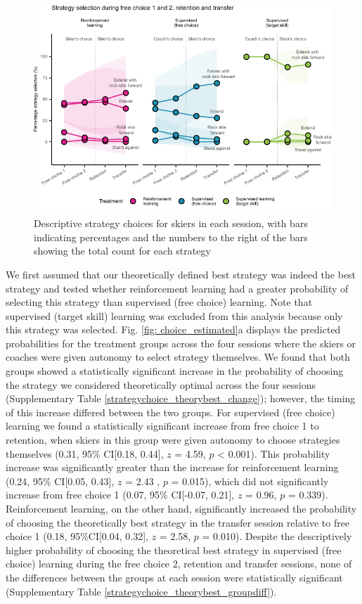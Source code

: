 \documentclass[pdflatex,sn-mathphys-num]{sn-jnl}%
\theoremstyle{thmstyleone}%
\theoremstyle{thmstyletwo}%
\theoremstyle{thmstylethree}%
\begin{document}
\begin{figure}[H]
\centering
\includegraphics{figures/figure_choice_descriptivecount_4.pdf}
\caption{Descriptive strategy choices for skiers in each session, with bars indicating percentages and the numbers to the right of the bars showing the total count for
each strategy}\label{fig: choice_descriptives}
\end{figure}


We first assumed that our theoretically defined best strategy was indeed the best strategy and tested whether reinforcement learning had a greater probability of selecting this strategy than supervised (free choice) learning. Note that supervised (target skill) learning was excluded from this analysis because only this strategy was selected. Fig. \ref{fig: choice_estimated}a displays the predicted probabilities for the treatment groups across the four sessions where the skiers or coaches were given autonomy to select strategy themselves. We found that both groups showed a statistically significant increase in the probability of choosing the strategy we considered theoretically optimal across the four sessions (Supplementary Table \ref{strategychoice_theorybest_change}); however, the timing of this increase differed between the two groups. For supervised (free choice) learning we found a statistically significant increase from free choice 1 to retention, when skiers in this group were given autonomy to choose strategies themselves (0.31, 95\% CI[0.18, 0.44], $z$ = 4.59, $p$ < 0.001). This probability increase was significantly greater than the increase for reinforcement learning (0.24, 95\% CI[0.05, 0.43], $z$ = 2.43 , $p$ = 0.015), which did not significantly increase from free choice 1 (0.07, 95\% CI[-0.07, 0.21], $z$ = 0.96, $p$ = 0.339). Reinforcement learning, on the other hand, significantly increased the probability of choosing the theoretically best strategy in the transfer session relative to free choice 1 (0.18, 95\%CI[0.04, 0.32], $z$ = 2.58, $p$ = 0.010). Despite the descriptively higher probability of choosing the theoretical best strategy in supervised (free choice) learning during the free choice 2, retention and transfer sessions, none of the differences between the groups at each session were statistically significant (Supplementary Table \ref{strategychoice_theorybest_groupdiff}). 
\end{document}
